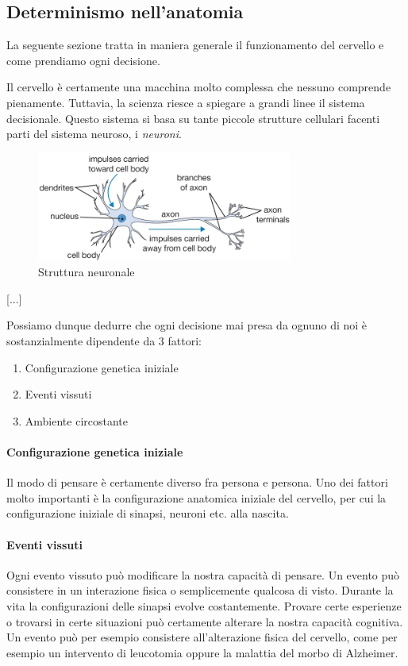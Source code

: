 \documentclass{article}
\begin{document}
\subsection{Determinismo nell'anatomia}

La seguente sezione tratta in maniera generale il funzionamento del cervello
e come prendiamo ogni decisione.

Il cervello è certamente una macchina molto complessa che nessuno
comprende pienamente. Tuttavia, la scienza riesce a spiegare a grandi linee
il sistema decisionale. Questo sistema si basa su tante piccole strutture cellulari
facenti parti del sistema neuroso, i \textit{neuroni}.

\begin{figure}[h]
    \centering
    \includegraphics[width=0.75\textwidth]{neuron.png}
    \caption{Struttura neuronale}
\end{figure}

[...]

Possiamo dunque dedurre che ogni decisione mai presa da ognuno di noi è
sostanzialmente dipendente da 3 fattori:
\begin{enumerate}
    \item Configurazione genetica iniziale
    \item Eventi vissuti
    \item Ambiente circostante
\end{enumerate}

\paragraph{Configurazione genetica iniziale}
Il modo di pensare è certamente diverso fra persona e persona.
Uno dei fattori molto importanti è la configurazione anatomica iniziale del cervello,
per cui la configurazione iniziale di sinapsi, neuroni etc. alla nascita.

\paragraph{Eventi vissuti}
Ogni evento vissuto può modificare la nostra capacità di pensare.
Un evento può consistere in un interazione fisica o semplicemente qualcosa di visto.
Durante la vita la configurazioni delle sinapsi evolve costantemente. Provare certe esperienze
o trovarsi in certe situazioni può certamente alterare la nostra capacità cognitiva.
Un evento può per esempio consistere all'alterazione fisica del cervello, come per esempio
un intervento di leucotomia oppure la malattia del morbo di Alzheimer.
\end{document}
